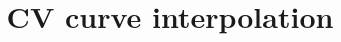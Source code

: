\documentclass{article}
\numberwithin{equation}{section}
\begin{document}
\title{CV curve interpolation}
\maketitle

%
\end{document}
